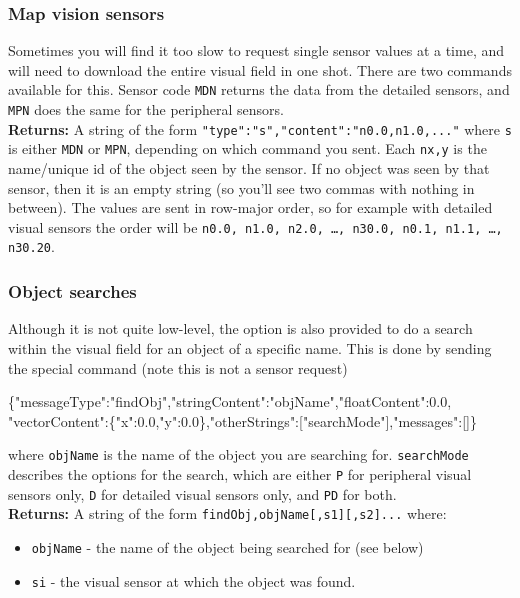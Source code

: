 \subsubsection{Map vision sensors}

Sometimes you will find it too slow to request single sensor values at a time, and will need to download the entire visual field in one shot. There are two commands available for this. Sensor code \texttt{MDN} returns the data from the detailed sensors, and \texttt{MPN} does the same for the peripheral sensors. \\

\noindent \textbf{Returns:} A string of the form \texttt{"type":"s","content":"n0.0,n1.0,..."} where \texttt{s} is either \texttt{MDN} or \texttt{MPN}, depending on which command you sent. Each \texttt{nx,y} is the name/unique id of the object seen by the sensor. If no object was seen by that sensor, then it is an empty string (so you'll see two commas with nothing in between). The values are sent in row-major order, so for example with detailed visual sensors the order will be \texttt{n0.0, n1.0, n2.0, \ldots, n30.0, n0.1, n1.1, \ldots, n30.20}.

\subsubsection{Object searches}

Although it is not quite low-level, the option is also provided to do a search within the visual field for an object of a specific name. This is done by sending the special command (note this is not a sensor request)
\begin{center}
	\scriptsize{\{"messageType":"findObj","stringContent":"objName","floatContent":0.0, "vectorContent":\{"x":0.0,"y":0.0\},"otherStrings":["searchMode"],"messages":[]\}}
\end{center}
 where \texttt{objName} is the name of the object you are searching for. \texttt{searchMode} describes the options for the search, which are either \texttt{P} for peripheral visual sensors only, \texttt{D} for detailed visual sensors only, and \texttt{PD} for both.\\

\noindent \textbf{Returns:} A string of the form \texttt{findObj,objName[,s1][,s2]...} where:

\begin{itemize}
\item \texttt{objName} - the name of the object being searched for (see below)
\item \texttt{si} - the visual sensor at which the object was found. 
\end{itemize}

